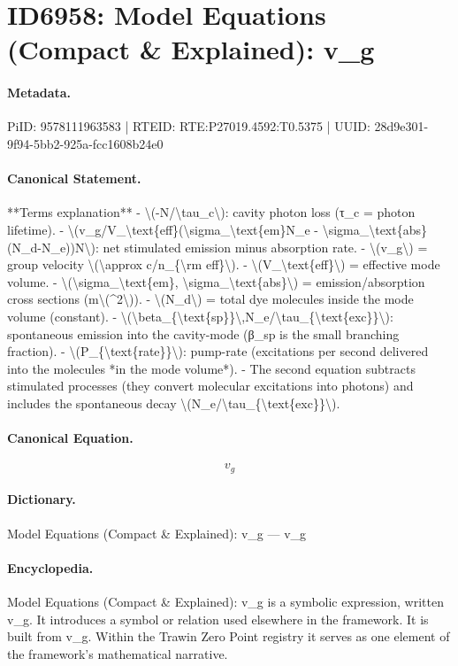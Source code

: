\section*{ID6958: Model Equations (Compact \& Explained): v\_g}
\paragraph{Metadata.}
PiID: 9578111963583 | RTEID: RTE:P27019.4592:T0.5375 | UUID: 28d9e301-9f94-5bb2-925a-fcc1608b24e0

\paragraph{Canonical Statement.}
**Terms explanation** - \textbackslash{}(-N/\textbackslash{}tau\_c\textbackslash{}): cavity photon loss (τ\_c = photon lifetime). - \textbackslash{}(v\_g/V\_\textbackslash{}text\{eff\}(\textbackslash{}sigma\_\textbackslash{}text\{em\}N\_e - \textbackslash{}sigma\_\textbackslash{}text\{abs\}(N\_d-N\_e))N\textbackslash{}): net stimulated emission minus absorption rate. - \textbackslash{}(v\_g\textbackslash{}) = group velocity \textbackslash{}(\textbackslash{}approx c/n\_\{\textbackslash{}rm eff\}\textbackslash{}). - \textbackslash{}(V\_\textbackslash{}text\{eff\}\textbackslash{}) = effective mode volume. - \textbackslash{}(\textbackslash{}sigma\_\textbackslash{}text\{em\}, \textbackslash{}sigma\_\textbackslash{}text\{abs\}\textbackslash{}) = emission/absorption cross sections (m\textbackslash{}(\textasciicircum{}2\textbackslash{})). - \textbackslash{}(N\_d\textbackslash{}) = total dye molecules inside the mode volume (constant). - \textbackslash{}(\textbackslash{}beta\_\{\textbackslash{}text\{sp\}\}\textbackslash{},N\_e/\textbackslash{}tau\_\{\textbackslash{}text\{exc\}\}\textbackslash{}): spontaneous emission into the cavity-mode (β\_sp is the small branching fraction). - \textbackslash{}(P\_\{\textbackslash{}text\{rate\}\}\textbackslash{}): pump-rate (excitations per second delivered into the molecules *in the mode volume*). - The second equation subtracts stimulated processes (they convert molecular excitations into photons) and includes the spontaneous decay \textbackslash{}(N\_e/\textbackslash{}tau\_\{\textbackslash{}text\{exc\}\}\textbackslash{}).

\paragraph{Canonical Equation.}
\[
v_g
\]

\paragraph{Dictionary.}
Model Equations (Compact \& Explained): v\_g — v\_g

\paragraph{Encyclopedia.}
Model Equations (Compact \& Explained): v\_g is a symbolic expression, written v\_g. It introduces a symbol or relation used elsewhere in the framework. It is built from v\_g. Within the Trawin Zero Point registry it serves as one element of the framework's mathematical narrative.
